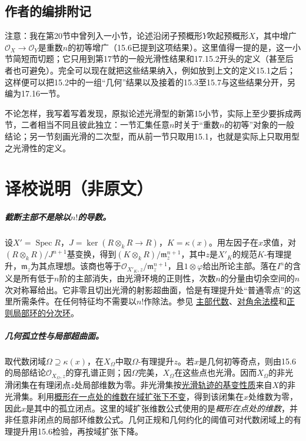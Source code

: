 \documentclass[openany,fontset=fandol]{ctexbook}
\newcommand{\OO}{\mathcal O}
\newcommand{\m}{\mathfrak m}
\DeclareMathOperator{\Spec}{Spec}
\begin{document}
\section*{作者的编排附记}
注意：我在第20节中曾列入一小节，论述沿闭子预概形$Y$吹起预概形$X$，其中增广$\OO_X\to\OO_Y$是重数$n$的初等增广（15.6已提到这项结果）。这里值得一提的是，这一小节简短而切题；它只用到第17节的一般光滑性结果和17.15.2开头的定义（甚至后者也可避免）。完全可以现在就把这些结果纳入，例如放到上文的定义15.1之后；这样便可以把15.2中的一组“几何”结果以及接着的15.3至15.7与这些结果分开，另编为17.16一节。

不论怎样，我写着写着发现，原拟论述光滑型的新第15小节，实际上至少要拆成两节，二者相当不同且彼此独立：一节汇集任意$n$时关于“重数$n$的初等”对象的一般结论；另一节刻画光滑的二次型，而从前一节只取用15.1，也就是实际上只取用型之光滑性的定义。

\chapter*{译校说明（非原文）}
\paragraph{截断主部不是除以$n!$的导数。}
设$X'=\Spec R$，$J=\ker(R\otimes_kR\to R)$，$K=\kappa(x)$。用左因子在$x$求值，对$(R\otimes_k R)/J^{n+1}$基变换，得到$(K\otimes_k R)/\m_z^{n+1}$，其中$z$是$X'_K$的规范$K$-有理提升，$\m_z$为其点理想。该商也等于$\OO_{X'_K,z}/\m_z^{n+1}$，且$1\otimes\varphi$给出所论主部。落在$I^n$的含义是所有低于$n$阶的主部消失，由光滑环境的正则性，次数$n$的分量由切余空间的$n$次对称幂给出。它非零且切出光滑的射影超曲面，恰是有理提升处“普通零点”的这里所需条件。在任何特征均不需要以$n!$作除法。参见 \href{https://stacks.math.columbia.edu/tag/09CH}{主部代数}、\href{https://stacks.math.columbia.edu/tag/08S2}{对角余法模}和\href{https://stacks.math.columbia.edu/tag/00NO}{正则局部环的分次环}。

\paragraph{几何孤立性与局部超曲面。}
取代数闭域$\Omega\supseteq\kappa(x)$，在$X_\Omega$中取$\Omega$-有理提升$z$。若$x$是几何初等奇点，则由15.6的局部结论$\OO_{X_\Omega,z}$的穿孔谱正则；因$\Omega$完美，$X_\Omega$在这些点也光滑。因而$X_\Omega$的非光滑闭集在有理闭点$z$处局部维数为零。非光滑集按\href{https://stacks.math.columbia.edu/tag/02V4}{光滑轨迹的基变性质}来自$X$的非光滑集。利用\href{https://stacks.math.columbia.edu/tag/00P4}{概形在一点处的维数在域扩张下不变}，得到该闭集在$x$处维数为零，因此$x$是其中的孤立闭点。这里的域扩张维数公式使用的是\emph{概形在点处的维数}，并非任意非闭点的局部环维数公式。几何正规和几何约化的阈值可对代数闭域上的有理提升用15.6检验，再按域扩张下降。
\end{document}
